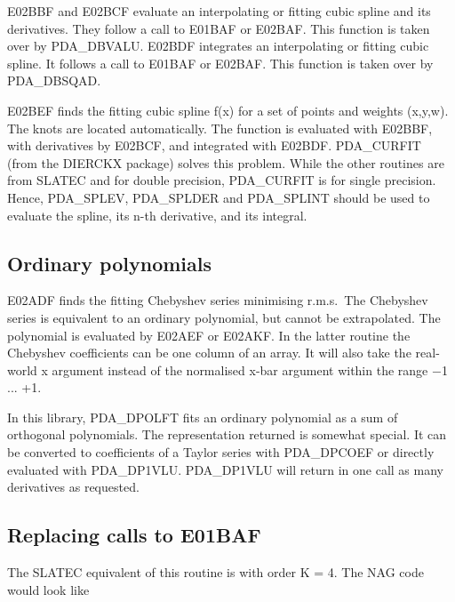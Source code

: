    E02BBF and E02BCF evaluate an interpolating or fitting cubic spline
   and its derivatives. They follow a call to E01BAF or E02BAF. 
   This function is taken over by PDA\_DBVALU. 
   E02BDF integrates an interpolating or fitting cubic spline. It
   follows a call to E01BAF or E02BAF. This function is taken over by
   PDA\_DBSQAD.

   E02BEF finds the fitting cubic spline f(x) for a set of points and
   weights (x,y,w). The knots are located automatically. The function is
   evaluated with E02BBF, with derivatives by E02BCF, and integrated
   with E02BDF. PDA\_CURFIT (from the DIERCKX package) solves this problem.
   While the other routines are from SLATEC and for double precision,
   PDA\_CURFIT is for single precision. Hence, PDA\_SPLEV, PDA\_SPLDER
   and PDA\_SPLINT should be used to evaluate the spline, its n-th derivative,
   and its integral. 


\subsection{Ordinary polynomials}

   E02ADF finds the fitting Chebyshev series minimising r.m.s.\ The
   Chebyshev series is equivalent to an ordinary polynomial, but cannot
   be extrapolated. The
   polynomial is evaluated by E02AEF or E02AKF. In the latter
   routine the Chebyshev coefficients can be one column of an array.
   It will also take the real-world x argument instead of the normalised
   x-bar argument within the range $-$1 ... +1.

   In this library, PDA\_DPOLFT fits an ordinary polynomial as a sum of
   orthogonal polynomials. The representation returned is somewhat
   special. It can be converted to coefficients of a Taylor series with
   PDA\_DPCOEF or directly evaluated with PDA\_DP1VLU. PDA\_DP1VLU will
   return in one call as many derivatives as requested.


\subsection{\label{m_e01baf}Replacing calls to E01BAF}

   The SLATEC equivalent of this routine is
   with order K = 4. The NAG code would look like

